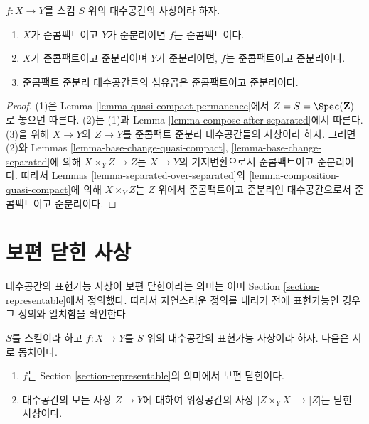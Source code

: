 \begin{lemma}
\label{lemma-quasi-compact-quasi-separated-permanence}
$f : X \to Y$를 스킴 $S$ 위의 대수공간의 사상이라 하자.
\begin{enumerate}
\item $X$가 준콤팩트이고 $Y$가 준분리이면 $f$는 준콤팩트이다.
\item $X$가 준콤팩트이고 준분리이며 $Y$가 준분리이면,
$f$는 준콤팩트이고 준분리이다.
\item 준콤팩트 준분리 대수공간들의 섬유곱은 준콤팩트이고 준분리이다.
\end{enumerate}
\end{lemma}

\begin{proof}
(1)은 Lemma \ref{lemma-quasi-compact-permanence}에서
$Z = S = \Spec(\mathbf{Z})$로 놓으면 따른다.
(2)는 (1)과 Lemma \ref{lemma-compose-after-separated}에서 따른다.
(3)을 위해 $X \to Y$와 $Z \to Y$를 준콤팩트 준분리 대수공간들의
사상이라 하자. 그러면 (2)와 Lemmas
\ref{lemma-base-change-quasi-compact},
\ref{lemma-base-change-separated}에 의해
$X \times_Y Z \to Z$는 $X \to Y$의 기저변환으로서 준콤팩트이고
준분리이다. 따라서 Lemmas \ref{lemma-separated-over-separated}와
\ref{lemma-composition-quasi-compact}에 의해
$X \times_Y Z$는 $Z$ 위에서 준콤팩트이고 준분리인 대수공간으로서
준콤팩트이고 준분리이다.
\end{proof}


\section{보편 닫힌 사상}
\label{section-universally-closed}

\noindent
대수공간의 표현가능 사상이 보편 닫힌이라는 의미는 이미
Section \ref{section-representable}에서 정의했다.
따라서 자연스러운 정의를 내리기 전에 표현가능인 경우 그 정의와
일치함을 확인한다.

\begin{lemma}
\label{lemma-characterize-representable-universally-closed}
$S$를 스킴이라 하고 $f : X \to Y$를 $S$ 위의 대수공간의
표현가능 사상이라 하자. 다음은 서로 동치이다.
\begin{enumerate}
\item $f$는 Section \ref{section-representable}의 의미에서 보편 닫힌이다.
\item 대수공간의 모든 사상 $Z \to Y$에 대하여 위상공간의 사상
$|Z \times_Y X| \to |Z|$는 닫힌 사상이다.
\end{enumerate}
\end{lemma}

